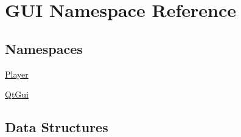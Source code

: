 \hypertarget{namespaceGUI}{}\section{G\+U\+I Namespace Reference}
\label{namespaceGUI}
\subsection*{Namespaces}
\begin{DoxyCompactItemize}
\item 
 \hyperlink{namespaceGUI_1_1Player}{Player}
\item 
 \hyperlink{namespaceGUI_1_1QtGui}{Qt\+Gui}
\end{DoxyCompactItemize}
\subsection*{Data Structures}
